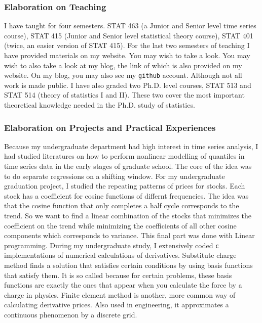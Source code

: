 \documentclass[utf8,letterpaper,oneside]{article}
\begin{document}
\subsubsection*{Elaboration on Teaching}
I have taught for four semesters. STAT 463 (a Junior and Senior level time series course), STAT 415 (Junior and Senior level statistical theory course), STAT 401 (twice, an easier version of STAT 415). For the last two semesters of teaching I have provided materials on my website. You may wish to take a look. You may wish to also take a look at my blog, the link of which is also provided on my website. On my blog, you may also see my \texttt{github} account. Although not all work is made public. I have also graded two Ph.D. level courses, STAT 513 and STAT 514 (theory of statistics I and II). These two cover the most important theoretical knowledge needed in the Ph.D. study of statistics.
\subsubsection*{Elaboration on Projects and Practical Experiences}
Because my undergraduate department had high interest in time series analysis, I had studied literatures on how to perform nonlinear modelling of quantiles in time series data in the early stages of graduate school. The core of the idea was to do separate regressions on a shifting window. For my undergraduate graduation project, I studied the repeating patterns of prices for stocks. Each stock has a coefficient for cosine functions of differnt frequencies. The idea was that the cosine function that only completes a half cycle corresponds to the trend. So we want to find a linear combination of the stocks that minimizes the coefficient on the trend while minimizing the coefficients of all other cosine components which corresponds to variance. This final part was done with Linear programming. During my undergraduate study, I extensively coded \texttt{c} implementations of numerical calculations of derivatives. Substitute charge method finds a solution that satisfies certain conditions by using basis functions that satisfy them. It is so called because for certain problems, these basis functions are exactly the ones that appear when you calculate the force by a charge in physics. Finite element method is another, more common way of calculating derivative prices. Also used in engineering, it approximates a continuous phenomenon by a discrete grid.
\end{document}
